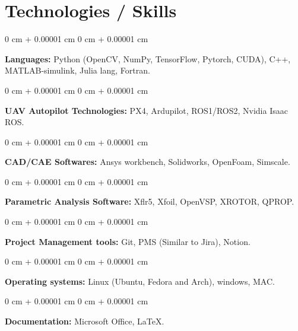 \documentclass[10pt, letterpaper]{article}
\newenvironment{onecolentry}{
    \begin{adjustwidth}{
        0 cm + 0.00001 cm
    }{
        0 cm + 0.00001 cm
    }
}{
    \end{adjustwidth}
} %
\begin{document}
   \section{Technologies / Skills}

        \begin{onecolentry}
            \textbf{Languages:} Python (OpenCV, NumPy, TensorFlow, Pytorch, CUDA), C++, MATLAB-simulink, Julia lang, Fortran.
        \end{onecolentry}

        \vspace{0.2 cm}

        \begin{onecolentry}
            \textbf{UAV Autopilot Technologies:} PX4, Ardupilot, ROS1/ROS2, Nvidia Isaac ROS.
        \end{onecolentry}

         \vspace{0.2 cm}

        \begin{onecolentry}
            \textbf{CAD/CAE Softwares:} Ansys workbench, Solidworks, OpenFoam, Simscale.
        \end{onecolentry}
         \vspace{0.2 cm}

        \begin{onecolentry}
            \textbf{Parametric Analysis Software:} Xflr5, Xfoil, OpenVSP, XROTOR, QPROP.
        \end{onecolentry}
        \vspace{0.2 cm}

        \begin{onecolentry}
            \textbf{Project Management tools:} Git, PMS (Similar to Jira), Notion.
        \end{onecolentry}
         \vspace{0.2 cm}

        \begin{onecolentry}
            \textbf{Operating systems:} Linux (Ubuntu, Fedora and Arch), windows, MAC.
        \end{onecolentry}
         \vspace{0.2 cm}

        \begin{onecolentry}
            \textbf{Documentation:} Microsoft Office, LaTeX.
        \end{onecolentry}
        \vspace{0.2 cm}
\end{document}
